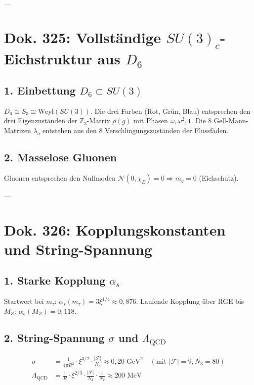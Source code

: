 \documentclass[11pt,a4paper]{article}
\begin{document}
	---
	
	\section{Dok. 325: Vollständige \texorpdfstring{$SU(3)_c$}{SU(3)\_c}-Eichstruktur aus $D_6$}
	
	\subsection{1. Einbettung $D_6 \subset SU(3)$}
	$D_6 \cong S_3 \cong \text{Weyl}(SU(3))$. Die drei Farben (Rot, Grün, Blau) entsprechen den drei Eigenzuständen der $\mathbb{Z}_3$-Matrix $\rho(g)$ mit Phasen $\omega, \omega^2, 1$.
	Die 8 Gell-Mann-Matrizen $\lambda_a$ entstehen aus den 8 Verschlingungszuständen der Flussfäden.
	
	\subsection{2. Masselose Gluonen}
	Gluonen entsprechen den Nullmoden $\mathcal{N}(0, \chi_E) = 0 \Rightarrow m_g = 0$ (Eichschutz).
	
	---
	
	\section{Dok. 326: Kopplungskonstanten und String-Spannung}
	
	\subsection{1. Starke Kopplung $\alpha_s$}
	Startwert bei $m_\tau$: $\alpha_s(m_\tau) = 3\xi^{1/4} \approx 0{,}876$.
	Laufende Kopplung über RGE bis $M_Z$: $\alpha_s(M_Z) = 0{,}118$.
	
	\subsection{2. String-Spannung $\sigma$ und $\Lambda_{\text{QCD}}$}
	\begin{align}
		\sigma &= \frac{1}{4\pi R^2} \cdot \xi^{3/2} \cdot \frac{|\mathcal{F}|}{N_3} \approx 0{,}20\text{ GeV}^2 \quad (\text{mit } |\mathcal{F}|=9, N_3=80) \\
		\Lambda_{\text{QCD}} &= \frac{1}{R} \cdot \xi^{2/3} \cdot \frac{|\mathcal{F}|}{N_3} \cdot \frac{1}{N_c} \approx 200\text{ MeV}
	\end{align}
	
\end{document}
